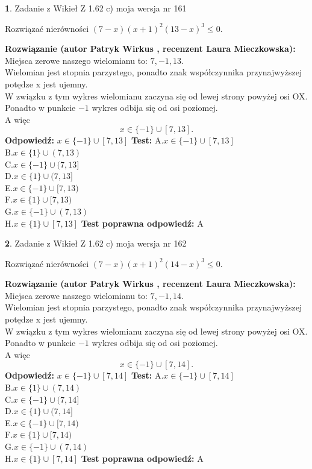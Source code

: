 \documentclass[12pt, a4paper]{article}
\theoremstyle{definition} %
\newtheorem{zad}{}
\newcommand{\zadStart}[1]{\begin{zad}#1\newline}
\newcommand{\zadStop}{\end{zad}}
\newcommand{\rozwStart}[2]{\noindent \textbf{Rozwiązanie (autor #1 , recenzent #2): }\newline}
\newcommand{\rozwStop}{\newline}
\newcommand{\odpStart}{\noindent \textbf{Odpowiedź:}\newline}
\newcommand{\odpStop}{\newline}
\newcommand{\testStart}{\noindent \textbf{Test:}\newline}
\newcommand{\testStop}{\newline}
\newcommand{\kluczStart}{\noindent \textbf{Test poprawna odpowiedź:}\newline}
\newcommand{\kluczStop}{\newline}
\begin{document}
\zadStart{Zadanie z Wikieł Z 1.62 c) moja wersja nr 161}

Rozwiązać nierówności $(7-x)(x+1)^{2}(13-x)^{3}\le0$.
\zadStop
\rozwStart{Patryk Wirkus}{Laura Mieczkowska}
Miejsca zerowe naszego wielomianu to: $7, -1, 13$.\\
Wielomian jest stopnia parzystego, ponadto znak współczynnika przy\linebreak najwyższej potędze x jest ujemny.\\ W związku z tym wykres wielomianu zaczyna się od lewej strony powyżej osi OX.\\
Ponadto w punkcie $-1$ wykres odbija się od osi poziomej.\\
A więc $$x \in \{-1\} \cup [7,13].$$
\rozwStop
\odpStart
$x \in \{-1\} \cup [7,13]$
\odpStop
\testStart
A.$x \in \{-1\} \cup [7,13]$\\
B.$x \in \{1\} \cup (7,13)$\\
C.$x \in \{-1\} \cup (7,13]$\\
D.$x \in \{1\} \cup (7,13]$\\
E.$x \in \{-1\} \cup [7,13)$\\
F.$x \in \{1\} \cup [7,13)$\\
G.$x \in \{-1\} \cup (7,13)$\\
H.$x \in \{1\} \cup [7,13]$
\testStop
\kluczStart
A
\kluczStop



\zadStart{Zadanie z Wikieł Z 1.62 c) moja wersja nr 162}

Rozwiązać nierówności $(7-x)(x+1)^{2}(14-x)^{3}\le0$.
\zadStop
\rozwStart{Patryk Wirkus}{Laura Mieczkowska}
Miejsca zerowe naszego wielomianu to: $7, -1, 14$.\\
Wielomian jest stopnia parzystego, ponadto znak współczynnika przy\linebreak najwyższej potędze x jest ujemny.\\ W związku z tym wykres wielomianu zaczyna się od lewej strony powyżej osi OX.\\
Ponadto w punkcie $-1$ wykres odbija się od osi poziomej.\\
A więc $$x \in \{-1\} \cup [7,14].$$
\rozwStop
\odpStart
$x \in \{-1\} \cup [7,14]$
\odpStop
\testStart
A.$x \in \{-1\} \cup [7,14]$\\
B.$x \in \{1\} \cup (7,14)$\\
C.$x \in \{-1\} \cup (7,14]$\\
D.$x \in \{1\} \cup (7,14]$\\
E.$x \in \{-1\} \cup [7,14)$\\
F.$x \in \{1\} \cup [7,14)$\\
G.$x \in \{-1\} \cup (7,14)$\\
H.$x \in \{1\} \cup [7,14]$
\testStop
\kluczStart
A
\kluczStop
\end{document}
